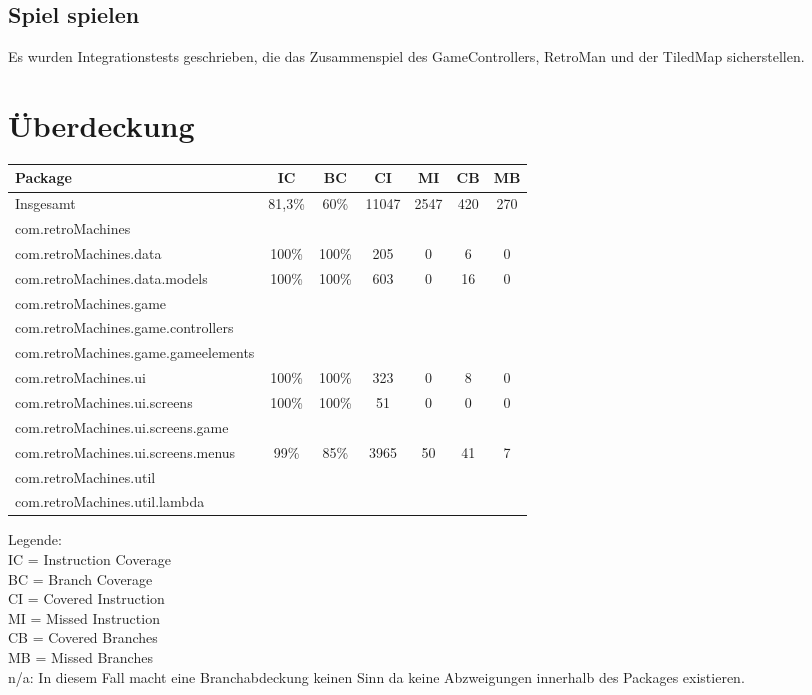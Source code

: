 \documentclass[parskip=full]{scrreprt}
\begin{document}
\section{Spiel spielen}

Es wurden Integrationstests geschrieben, die das Zusammenspiel des GameControllers, RetroMan und der TiledMap sicherstellen.

\chapter{Überdeckung}

\begin{tabular} { | l | c | c | c | c | c | c | }
	\hline
	\textbf{Package} & \textbf{IC} & \textbf{BC} & \textbf{CI} & \textbf{MI} & \textbf{CB} & \textbf{MB} \\
	\hline
	Insgesamt & 81,3\% & 60\% & 11047 & 2547 & 420 & 270 \\
	\hline
	com.retroMachines \\
	\hline
	com.retroMachines.data & 100\% & 100\% & 205 & 0 & 6 & 0  \\
	\hline
	com.retroMachines.data.models & 100\% & 100\% & 603 & 0 & 16 & 0 \\
	\hline
	com.retroMachines.game \\
	\hline
	com.retroMachines.game.controllers \\
	\hline
	com.retroMachines.game.gameelements \\
	\hline
	com.retroMachines.ui & 100\% & 100\% & 323 & 0 & 8 & 0 \\
	\hline
	com.retroMachines.ui.screens & 100\% & 100\% & 51 & 0 & 0 & 0 \\
	\hline
	com.retroMachines.ui.screens.game \\
	\hline
	com.retroMachines.ui.screens.menus & 99\% & 85\% & 3965 & 50 & 41 & 7 \\
	\hline
	com.retroMachines.util \\
	\hline
	com.retroMachines.util.lambda \\
	\hline
\end{tabular}

Legende: \\
	IC = Instruction Coverage \\
	BC = Branch Coverage \\
	CI = Covered Instruction \\
	MI = Missed Instruction \\
	CB = Covered Branches \\
	MB = Missed Branches \\
	n/a: In diesem Fall macht eine Branchabdeckung keinen Sinn da keine Abzweigungen innerhalb des Packages existieren. \\
\end{document}
